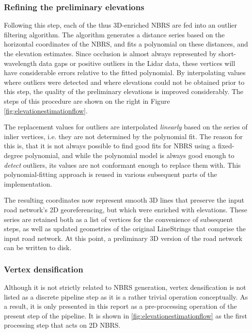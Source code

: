 \subsubsection{Refining the preliminary elevations}

Following this step, each of the thus 3D-enriched NBRS are fed into an outlier filtering algorithm. The algorithm generates a distance series based on the horizontal coordinates of the NBRS, and fits a polynomial on these distances, and the elevation estimates. Since occlusion is almost always represented by short-wavelength data gaps or positive outliers in the Lidar data, these vertices will have considerable errors relative to the fitted polynomial. By interpolating values where outliers were detected and where elevations could not be obtained prior to this step, the quality of the preliminary elevations is improved considerably. The steps of this procedure are shown on the right in Figure \ref{fig:elevationestimationflow}.

The replacement values for outliers are interpolated \textit{linearly} based on the series of inlier vertices, i.e. they are not determined by the polynomial fit. The reason for this is, that it is not always possible to find good fits for NBRS using a fixed-degree polynomial, and while the polynomial model is always good enough to \textit{detect} outliers, its values are not conformant enough to replace them with. This polynomial-fitting approach is reused in various subsequent parts of the implementation.

The resulting coordinates now represent smooth 3D lines that preserve the input road network's 2D georeferencing, but which were enriched with elevations. These series are retained both as a list of vertices for the convenience of subsequent steps, as well as updated geometries of the original LineStrings that comprise the input road network. At this point, a preliminary 3D version of the road network can be written to disk.

\subsubsection{Vertex densification}

Although it is not strictly related to NBRS generation, vertex densification is not listed as a discrete pipeline step as it is a rather trivial operation conceptually. As a result, it is only presented in this report as a pre-processing operation of the present step of the pipeline. It is shown in \ref{fig:elevationestimationflow} as the first processing step that acts on 2D NBRS.

